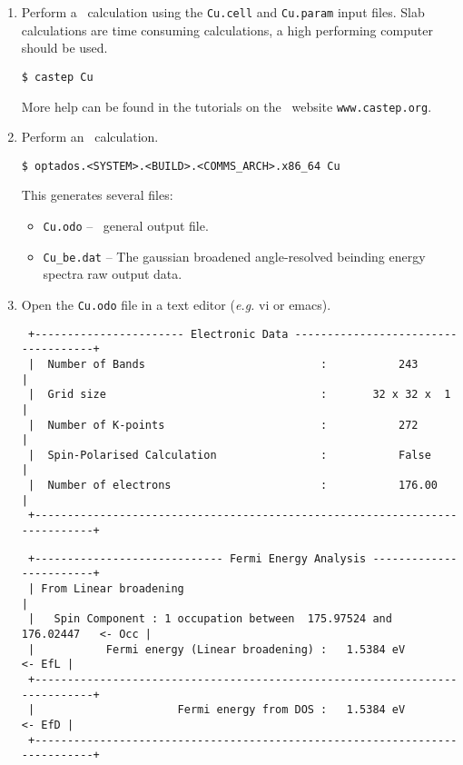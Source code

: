 \documentclass[a4paper,11pt,twoside]{book}
\begin{document}
\begin{enumerate}
\item Perform a \castep\ calculation using the  \verb#Cu.cell#  and \verb#Cu.param# input files. Slab calculations are time consuming calculations, a high performing computer should be used.

  \verb#$ castep Cu#

More help can be found in  the tutorials  on  the \castep\ website \verb#www.castep.org#.

\item Perform an \optados\ calculation.

\verb#$ optados.<SYSTEM>.<BUILD>.<COMMS_ARCH>.x86_64 Cu#

This generates several files:
\begin{itemize}
\item \verb#Cu.odo# -- \optados\ general output file.
\item \verb#Cu_be.dat# -- The gaussian broadened angle-resolved beinding energy spectra raw output data.
\end{itemize}

\item Open the \verb#Cu.odo# file in a text editor (\emph{e.g.} vi or emacs).

\begin{verbatim}
 +----------------------- Electronic Data ------------------------------------+
 |  Number of Bands                           :           243                 |
 |  Grid size                                 :       32 x 32 x  1            |
 |  Number of K-points                        :           272                 |
 |  Spin-Polarised Calculation                :           False               |
 |  Number of electrons                       :           176.00              |
 +----------------------------------------------------------------------------+
\end{verbatim}



\begin{verbatim}
 +----------------------------- Fermi Energy Analysis ------------------------+
 | From Linear broadening                                                     |
 |   Spin Component : 1 occupation between  175.97524 and  176.02447   <- Occ |
 |           Fermi energy (Linear broadening) :   1.5384 eV            <- EfL |
 +----------------------------------------------------------------------------+
 |                      Fermi energy from DOS :   1.5384 eV            <- EfD |
 +----------------------------------------------------------------------------+


\end{verbatim}
\end{enumerate}
\end{document}
